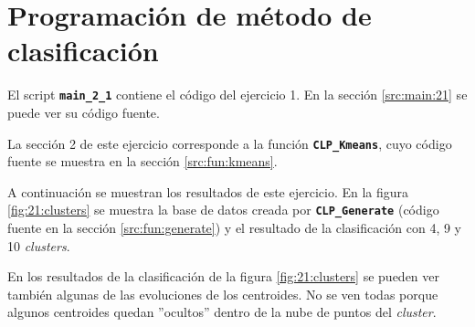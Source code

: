 \documentclass[11pt]{article} %
\begin{document}
\section{Programación de método de clasificación}

El script \textbf{\texttt{main\_2\_1}} contiene el código del ejercicio 1. En
la sección \ref{src:main:21} se puede ver su código fuente.

La sección 2 de este ejercicio corresponde a la función
\textbf{\texttt{CLP\_Kmeans}}, cuyo código fuente se muestra en la sección
\ref{src:fun:kmeans}.

A continuación se muestran los resultados de este ejercicio. En la figura
\ref{fig:21:clusters} se muestra la base de datos creada
por \textbf{\texttt{CLP\_Generate}} (código fuente en la sección
\ref{src:fun:generate}) y el resultado de la clasificación con 4, 9 y 10
\emph{clusters}.

En los resultados de la clasificación de la figura \ref{fig:21:clusters} se
pueden ver también algunas de las evoluciones de los centroides. No se ven todas
porque algunos centroides quedan ''ocultos'' dentro de la nube de puntos del
\emph{cluster}.
\end{document}
